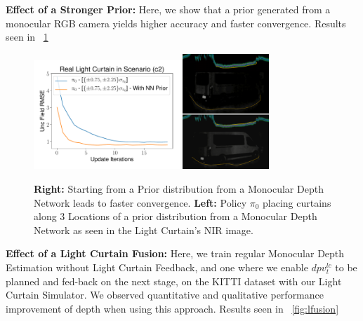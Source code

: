 \textbf{Effect of a Stronger Prior:} Here, we show that a prior generated from a monocular RGB camera yields higher accuracy and faster convergence. Results seen in ~\ref{fig:prior} 

\begin{figure}[h]
   \centering
   \begin{minipage}{0.5\textwidth}
       \centering
       \includegraphics[width=0.49\textwidth]{figures/figure_X.pdf}
       \includegraphics[width=0.29\textwidth]{figures/placement3.png}
   \end{minipage}\hfill
   \centering
   \caption{ \textbf{Right:} Starting from a Prior distribution from a Monocular Depth Network leads to faster convergence. \textbf{Left:} Policy $\pi_{0}$ placing curtains along 3 Locations of a prior distribution from a Monocular Depth Network as seen in the Light Curtain's NIR image.}
   \label{fig:prior} 
\end{figure}

\textbf{Effect of a Light Curtain Fusion:} Here, we train regular Monocular Depth Estimation without Light Curtain Feedback, and one where we enable $dpv_{t}^{lc}$ to be planned and fed-back on the next stage, on the KITTI dataset with our Light Curtain Simulator. We observed quantitative and qualitative performance improvement of depth when using this approach. Results seen in ~\ref{fig:lfusion} 


